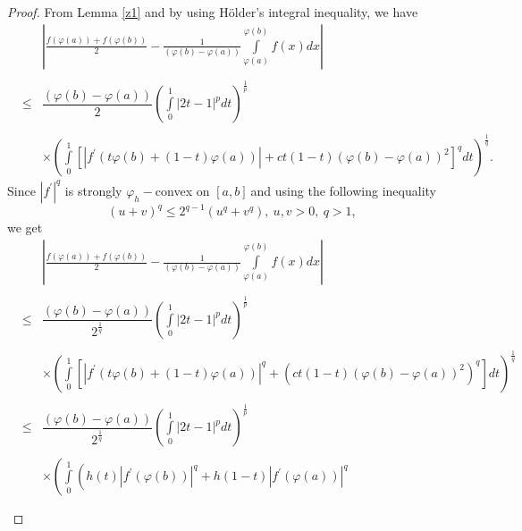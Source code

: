 \documentclass{amsart}
\theoremstyle{plain}
\numberwithin{equation}{section}
\begin{document}
\begin{proof}
From Lemma \ref{z1} and by using H\"{o}lder's integral inequality, we have\begin{eqnarray*}
&&\left\vert \frac{f\left( \varphi (a)\right) +f\left( \varphi (b)\right) }{2}-\frac{1}{(\varphi (b)-\varphi (a))}\int\limits_{\varphi (a)}^{\varphi
(b)}f\left( x\right) dx\right\vert  \\
&& \\
&\leq &\dfrac{(\varphi (b)-\varphi (a))}{2}\left(
\int\limits_{0}^{1}\left\vert 2t-1\right\vert ^{p}dt\right) ^{\frac{1}{p}} \\
&& \\
&&\times \left( \int\limits_{0}^{1}\left[ \left\vert f^{\prime }\left(
t\varphi (b)+\left( 1-t\right) \varphi (a)\right) \right\vert
+ct(1-t)(\varphi (b)-\varphi (a))^{2}\right] ^{q}dt\right) ^{\frac{1}{q}}.
\end{eqnarray*}Since $\left\vert f^{\prime }\right\vert ^{q}$ is strongly $\varphi _{h}-$convex on $\left[ a,b\right] \ $and using the following inequality 
\begin{equation*}
\left( u+v\right) ^{q}\leq 2^{q-1}(u^{q}+v^{q}),\ u,v>0,\ q>1,
\end{equation*}we get\begin{eqnarray*}
&&\left\vert \frac{f\left( \varphi (a)\right) +f\left( \varphi (b)\right) }{2}-\frac{1}{(\varphi (b)-\varphi (a))}\int\limits_{\varphi (a)}^{\varphi
(b)}f\left( x\right) dx\right\vert  \\
&& \\
&\leq &\dfrac{(\varphi (b)-\varphi (a))}{2^{\frac{1}{q}}}\left(
\int\limits_{0}^{1}\left\vert 2t-1\right\vert ^{p}dt\right) ^{\frac{1}{p}} \\
&& \\
&&\times \left( \int\limits_{0}^{1}\left[ \left\vert f^{\prime }\left(
t\varphi (b)+\left( 1-t\right) \varphi (a)\right) \right\vert ^{q}+\left(
ct(1-t)(\varphi (b)-\varphi (a))^{2}\right) ^{q}\right] dt\right) ^{\frac{1}{q}} \\
&& \\
&\leq &\dfrac{(\varphi (b)-\varphi (a))}{2^{\frac{1}{q}}}\left(
\int\limits_{0}^{1}\left\vert 2t-1\right\vert ^{p}dt\right) ^{\frac{1}{p}} \\
&& \\
&&\times \left( \int\limits_{0}^{1}\left( h(t)\left\vert f^{\prime }(\varphi
(b))\right\vert ^{q}+h(1-t)\left\vert f^{\prime }(\varphi (a))\right\vert
^{q}\right. \right.  \\
&& \\

\end{eqnarray*}
\end{proof}
\end{document}
